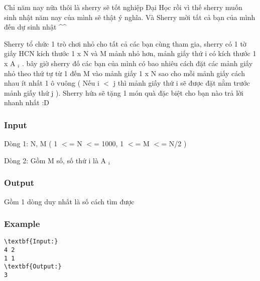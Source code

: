 



   Chỉ năm nay nữa thôi là sherry sẽ tốt nghiệp Đại Học rồi vì thế sherry muốn sinh nhật năm nay của mình sẽ thật ý nghĩa. Và Sherry mời tất cả bạn của mình đến dự sinh nhật \textasciicircum\textasciicircum  

   Sherry tổ chức 1 trò chơi nhỏ cho tất cả các bạn cùng tham gia, sherry có 1 tờ giấy HCN kích thước 1 x N và M mảnh nhỏ hơn, mảnh giấy thứ i có kích thước 1 x A   $_    i   $   . bây giờ sherry đố các bạn của mình có bao nhiêu cách đặt các mảnh giấy nhỏ theo thứ tự từ 1 đến M  vào mảnh giấy 1 x N sao cho mỗi mảnh giấy cách nhau ít nhất 1 ô vuông ( Nếu i $<$ j thì mảnh giấy thứ i sẽ được đặt nằm trước mảnh giấy thứ j ). Sherry hứa sẽ tặng 1 món quà đặc biệt cho bạn nào trả lời nhanh nhất :D  

\subsubsection{   Input  }

   Dòng 1: N, M ( 1 $<$= N $<$= 1000, 1 $<$= M $<$= N/2 )  

   Dòng 2: Gồm M số, số  thứ  i  là   A   $_    i   $

\subsubsection{   Output  }

   Gồm 1 dòng duy nhất là số cách tìm được  

\subsubsection{   Example  }
\begin{verbatim}
\textbf{Input:}
4 2
1 1
\textbf{Output:}
3
\end{verbatim}